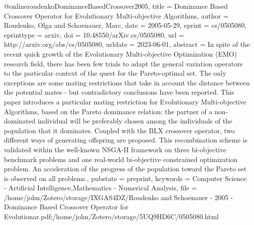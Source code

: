 \begin{thebibliography}
@online{roudenkoDominanceBasedCrossover2005,
  title = {Dominance {{Based Crossover Operator}} for {{Evolutionary Multi-objective Algorithms}}},
  author = {Roudenko, Olga and Schoenauer, Marc},
  date = {2005-05-29},
  eprint = {cs/0505080},
  eprinttype = {arxiv},
  doi = {10.48550/arXiv.cs/0505080},
  url = {http://arxiv.org/abs/cs/0505080},
  urldate = {2023-06-01},
  abstract = {In spite of the recent quick growth of the Evolutionary Multi-objective Optimization (EMO) research field, there has been few trials to adapt the general variation operators to the particular context of the quest for the Pareto-optimal set. The only exceptions are some mating restrictions that take in account the distance between the potential mates - but contradictory conclusions have been reported. This paper introduces a particular mating restriction for Evolutionary Multi-objective Algorithms, based on the Pareto dominance relation: the partner of a non-dominated individual will be preferably chosen among the individuals of the population that it dominates. Coupled with the BLX crossover operator, two different ways of generating offspring are proposed. This recombination scheme is validated within the well-known NSGA-II framework on three bi-objective benchmark problems and one real-world bi-objective constrained optimization problem. An acceleration of the progress of the population toward the Pareto set is observed on all problems.},
  pubstate = {preprint},
  keywords = {Computer Science - Artificial Intelligence,Mathematics - Numerical Analysis},
  file = {/home/john/Zotero/storage/IXGAS4DZ/Roudenko and Schoenauer - 2005 - Dominance Based Crossover Operator for Evolutionar.pdf;/home/john/Zotero/storage/5UQ9HD6C/0505080.html}
}


\end{thebibliography}

